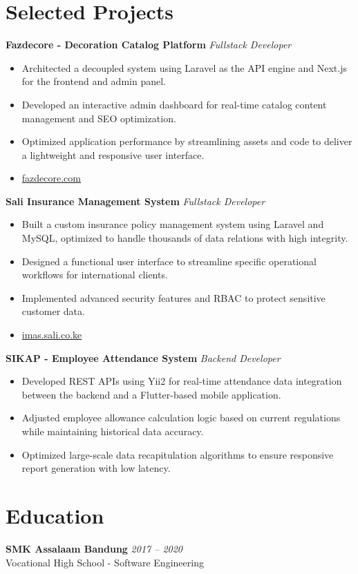\documentclass[11pt,a4paper]{article}
\begin{document}
\section*{Selected Projects}

\textbf{Fazdecore - Decoration Catalog Platform} \hfill \textit{Fullstack Developer}
\begin{itemize}
    \item Architected a decoupled system using Laravel as the API engine and Next.js for the frontend and admin panel.
    \item Developed an interactive admin dashboard for real-time catalog content management and SEO optimization.
    \item Optimized application performance by streamlining assets and code to deliver a lightweight and responsive user interface.
    \item \href{https://fazdecore.com/}{fazdecore.com}
\end{itemize}

\textbf{Sali Insurance Management System} \hfill \textit{Fullstack Developer}
\begin{itemize}
    \item Built a custom insurance policy management system using Laravel and MySQL, optimized to handle thousands of data relations with high integrity.
    \item Designed a functional user interface to streamline specific operational workflows for international clients.
    \item Implemented advanced security features and RBAC to protect sensitive customer data.
    \item \href{https://imas.sali.co.ke/}{imas.sali.co.ke}
\end{itemize}

\textbf{SIKAP - Employee Attendance System} \hfill \textit{Backend Developer}
\begin{itemize}
    \item Developed REST APIs using Yii2 for real-time attendance data integration between the backend and a Flutter-based mobile application.
    \item Adjusted employee allowance calculation logic based on current regulations while maintaining historical data accuracy.
    \item Optimized large-scale data recapitulation algorithms to ensure responsive report generation with low latency.
\end{itemize}

\section*{Education}
\textbf{SMK Assalaam Bandung} \hfill \textit{2017 -- 2020} \\
Vocational High School - Software Engineering
\end{document}

